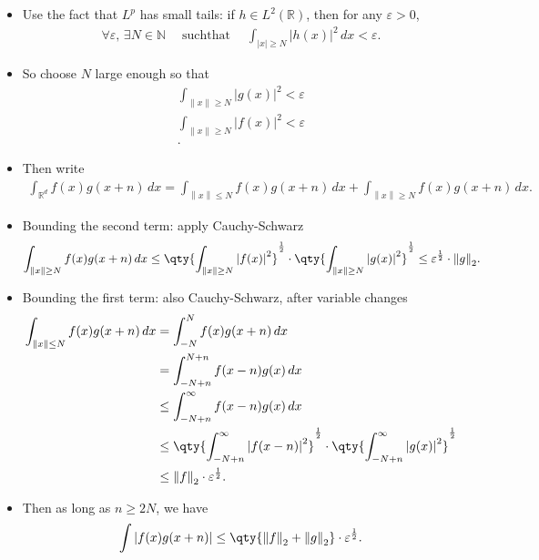\begin{solution}

\envlist

\begin{itemize}
\item
  Use the fact that \(L^p\) has small tails: if
  \(h\in L^2({\mathbb{R}})\), then for any \(\varepsilon> 0\),
  \begin{align*}  
  \forall \varepsilon,\, \exists N\in {\mathbb{N}}{\quad \operatorname{such that} \quad}\int_{{\left\lvert {x} \right\rvert} \geq {N}} {\left\lvert {h(x)} \right\rvert}^2 \,dx < \varepsilon
  .\end{align*}
\item
  So choose \(N\) large enough so that
  \begin{align*}  
  \int_{{\left\lVert {x} \right\rVert} \geq N}{\left\lvert {g(x)} \right\rvert}^2 < \varepsilon\\
  \int_{{\left\lVert {x} \right\rVert} \geq N}{\left\lvert {f(x)} \right\rvert}^2 < \varepsilon\\
  .\end{align*}
\item
  Then write
  \begin{align*}  
  \int_{{\mathbb{R}}^d} f(x) g(x+n) \,dx = \int_{{\left\lVert {x} \right\rVert} \leq N} f(x)g(x+n)\,dx + \int_{{\left\lVert {x} \right\rVert} \geq N} f(x) g(x+n)\,dx
  .\end{align*}
\item
  Bounding the second term: apply Cauchy-Schwarz
  \begin{align*}  
  \int_{{\left\lVert {x} \right\rVert} \geq N} f(x) g(x+n)\,dx
  \leq 
  \qty{ \int_{{\left\lVert {x} \right\rVert} \geq N} {\left\lvert {f(x)} \right\rvert}^2}^{1\over 2} \cdot 
  \qty{ \int_{{\left\lVert {x} \right\rVert} \geq N} {\left\lvert {g(x)} \right\rvert}^2}^{1\over 2}
  \leq \varepsilon^{1\over 2} \cdot {\left\lVert {g} \right\rVert}_2
  .\end{align*}
\item
  Bounding the first term: also Cauchy-Schwarz, after variable changes
  \begin{align*}  
  \int_{{\left\lVert {x} \right\rVert} \leq N} f(x) g(x+n)\,dx 
  &= \int_{-N}^N f(x) g(x+n)\,dx \\
  &= \int_{-N+n}^{N+n} f(x-n) g(x)\,dx \\
  &\leq \int_{-N+n}^{\infty} f(x-n) g(x)\,dx \\
  &\leq \qty{\int_{-N+n}^{\infty} {\left\lvert {f(x-n)} \right\rvert}^2}^{1\over 2}\cdot \qty{\int_{-N+n}^{\infty} {\left\lvert {g(x)} \right\rvert}^2}^{1\over 2} \\
  &\leq {\left\lVert {f} \right\rVert}_2 \cdot \varepsilon^{1\over 2}
  .\end{align*}
\item
  Then as long as \(n\geq 2N\), we have
  \begin{align*}  
  \int {\left\lvert {f(x) g(x+n)} \right\rvert} \leq \qty{{\left\lVert {f} \right\rVert}_2 + {\left\lVert {g} \right\rVert}_2} \cdot \varepsilon^{1\over 2} 
  .\end{align*}
\end{itemize}


\end{solution}
